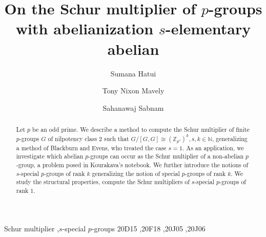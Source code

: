 \documentclass[preprint,sort&compress,12pt]{elsarticle}
\numberwithin{equation}{section}
\theoremstyle{definition}
\begin{document}
	
	\begin{frontmatter}
		


		
		\title{On the Schur multiplier of $p$-groups with abelianization $s$-elementary abelian}
		\author[NISER,HBNI]{Sumana Hatui}
		\author[NISER,HBNI]{Tony Nixon Mavely}
		\author[NISER,HBNI]{Sahanawaj Sabnam}
		\address[NISER]{School of Mathematical Sciences,  National Institute of Science Education and Research Bhubaneswar, 752050, Odisha, India.}
            \address[HBNI]{Homi Bhabha National Institute, Training School Complex, Anushakti Nagar, Mumbai, 400094, India}
		
		\begin{abstract}
			Let $p$ be an odd prime. We describe a method to compute the Schur multiplier of finite \(p\)-groups \(G\) of nilpotency class \(2\) such that
${G/[G,G] \cong (\mathbb{Z}_{p^{s}})^{k}, s,k \in \mathbb{N}}$,
generalizing a method of Blackburn and Evens, who treated the case \(s=1\).
As an application, we investigate which abelian \(p\)-groups can occur as the Schur multiplier of a non-abelian \(p\)-group, a problem posed in Kourakava’s notebook.
We further introduce the notions of \(s\)-special \(p\)-groups of rank $k$ generalizing the notion of special $p$-groups of rank $k$.
We study the structural properties, compute the Schur multipliers of \(s\)-special \(p\)-groups of rank $1$.

		\end{abstract}
		
		\begin{keyword}
			Schur multiplier  \sep $s$-special $p$-groups
			\MSC[2020]    20D15  \sep 20F18 \sep 20J05 \sep 20J06
		\end{keyword}
		
	\end{frontmatter}
\end{document}
